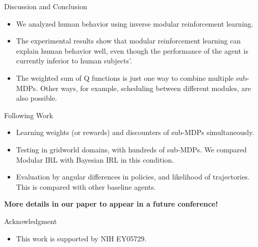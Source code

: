 \documentclass[final]{beamer}
\begin{document}
\begin{frame}{}
\begin{textblock}{86}
\begin{block}{Discussion and Conclusion}
\begin{itemize}
\item
We analyzed human behavior using inverse modular reinforcement learning.
\item
The experimental results show that modular reinforcement learning can explain
human behavior well, even though the performance of the agent is currently
inferior to human subjects'.
\item
The weighted sum of Q functions is just one way to combine multiple
sub-MDPs. Other ways, for example, scheduling between different modules, are
also possible.
\end{itemize}
\end{block}

\begin{block}{Following Work}
\begin{itemize}
\item
Learning weights (or rewards) and discounters of sub-MDPs simultaneously.
\item
Testing in gridworld domains, with hundreds of sub-MDPs. We compared Modular IRL
with Bayesian IRL in this condition.
\item
Evaluation by angular differences in policies, and likelihood of trajectories.
This is compared with other baseline agents.
\end{itemize}

{\bf More details in our paper to appear in a future conference!}
\end{block}

\begin{block}{Acknowledgment}
\begin{itemize}
\item This work is supported by NIH EY05729.
\end{itemize}
\end{block}

\end{textblock}

\end{frame}
\end{document}
